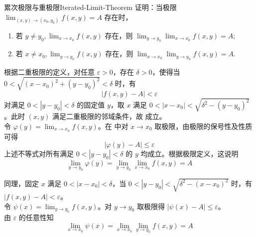 \begin{problem}{累次极限与重极限}{Iterated-Limit-Theorem}
    证明：当极限 $ \lim_{(x,y) \to (x_0, y_0)} f(x,y) = A$ 存在时，
    \begin{enumerate}
        \item 若 $y \neq y_0,  \lim_{x \to x_0} f(x,y)$ 存在，则 $ \lim_{y \to y_0} \lim_{x \to x_0} f(x,y) = A$;
        \item 若 $x \neq x_0,  \lim_{y \to y_0} f(x,y)$ 存在，则 $ \lim_{x \to x_0} \lim_{y \to y_0} f(x,y) = A$.
    \end{enumerate}
\end{problem}

\begin{myproof}

    根据二重极限的定义，对任意 $\varepsilon > 0$，存在 $\delta > 0$，使得当 $0 < \sqrt{(x-x_0)^2 + (y-y_0)^2} < \delta$ 时，有
    \begin{equation} \label{eq:limit-def-1}
        |f(x,y) - A| < \varepsilon
    \end{equation}
    对满足 $0 < |y - y_0| < \delta$ 的固定值 $y$，取 $x$ 满足 $0 < |x - x_0| < \sqrt{\delta^2 - (y-y_0)^2}$。此时 $(x,y)$ 满足二重极限的邻域条件，故  成立。\\
    令 $\varphi(y) =  \lim_{x \to x_0} f(x,y)$。在  中对 $x \to x_0$ 取极限，由极限的保号性及性质可得
    \begin{equation}
        |\varphi(y) - A| \leqslant \varepsilon
    \end{equation}
    上述不等式对所有满足 $0 < |y - y_0| < \delta$ 的 $y$ 均成立。根据极限定义，这说明
    \begin{equation}
        \lim_{y \to y_0} \varphi(y) = \lim_{y \to y_0} \lim_{x \to x_0} f(x,y) = A
    \end{equation}


    同理，固定 $x$ 满足 $0 < |x - x_0| < \delta$，当 $0 < |y - y_0| < \sqrt{\delta^2 - (x-x_0)^2}$ 时，有 $|f(x,y) - A| < \varepsilon$。\\
    令 $\psi(x) =  \lim_{y \to y_0} f(x,y)$。对 $y \to y_0$ 取极限得 $|\psi(x) - A| \leqslant \varepsilon$。\\
    由 $\varepsilon$ 的任意性知
    \begin{equation}
        \lim_{x \to x_0} \psi(x) = \lim_{x \to x_0} \lim_{y \to y_0} f(x,y) = A
    \end{equation}
\end{myproof}


